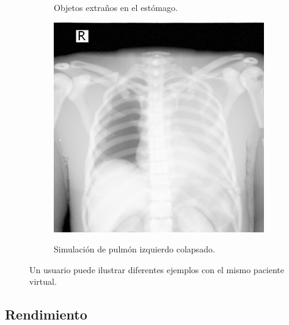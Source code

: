 \begin{figure}[ht]
\begin{subfigure}[b]{0.3\linewidth}
        \caption{Objetos extraños en el estómago.}
    \end{subfigure}
    \null\hfill
     \begin{subfigure}[b]{0.3\linewidth}
        \centering
        {\includegraphics[width=\linewidth]{IMG/HVPLung.png}}
        \caption{Simulación de pulmón izquierdo colapsado.}
    \end{subfigure}
    \caption{\label{fig:diseaseresult} Un usuario puede ilustrar diferentes ejemplos con el mismo paciente virtual.}
   \end{figure}


\clearpage
\subsection{Rendimiento}

